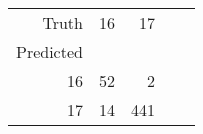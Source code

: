 \begin{tabular}{rrrrr}
\toprule
Truth & 16 & 17 \\
Predicted &  &  \\
\midrule
16 & 52 & 2 \\
17 & 14 & 441 \\
\bottomrule
\end{tabular}
